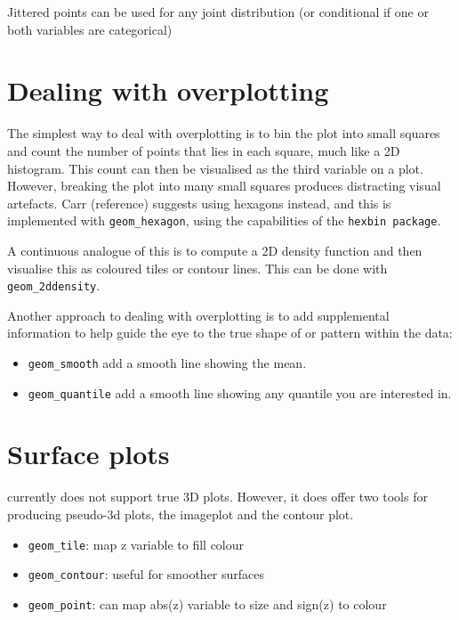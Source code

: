 Jittered points can be used for any joint distribution (or conditional if one or both variables are categorical)

\section{Dealing with overplotting}\label{sec:overplotting}

The simplest way to deal with overplotting is to bin the plot into small squares and count the number of points that lies in each square, much like a 2D histogram.  This count can then be visualised as the third variable on a plot.  However, breaking the plot into many small squares produces distracting visual artefacts.  Carr (reference) suggests using hexagons instead, and this is implemented with {\tt geom\_hexagon}, using the capabilities of the {\tt hexbin package}.

A continuous analogue of this is to compute a 2D density function and then visualise this as coloured tiles or contour lines.  This can be done with {\tt geom\_2ddensity}.

Another approach to dealing with overplotting is to add supplemental information to help guide the eye to the true shape of or pattern within the data:

\begin{itemize}
	\item {\tt geom\_smooth} add a smooth line showing the mean.
	\item {\tt geom\_quantile} add a smooth line showing any quantile you are interested in.
\end{itemize}

\section{Surface plots}

\ggplot currently does not support true 3D plots.  However, it does offer two tools for producing pseudo-3d plots, the imageplot and the contour plot.

\begin{itemize}
	\item {\tt geom\_tile}: map z variable to fill colour
	\item {\tt geom\_contour}: useful for smoother surfaces
	\item {\tt geom\_point}: can map abs(z) variable to size and sign(z) to colour
\end{itemize}

